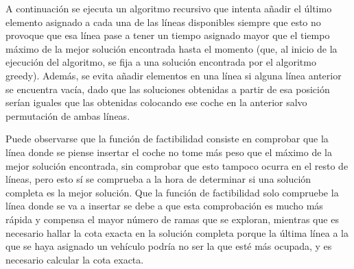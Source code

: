 A continuación se ejecuta un algoritmo recursivo que intenta añadir el último elemento asignado a cada una de las líneas disponibles siempre que esto no provoque que esa línea pase a tener un tiempo asignado mayor que el tiempo máximo de la mejor solución encontrada hasta el momento (que, al inicio de la ejecución del algoritmo, se fija a una solución encontrada por el algoritmo greedy). Además, se evita añadir elementos en una línea si alguna línea anterior se encuentra vacía, dado que las soluciones obtenidas a partir de esa posición serían iguales que las obtenidas colocando ese coche en la anterior salvo permutación de ambas líneas.


Puede observarse que la función de factibilidad consiste en comprobar que la línea donde se piense insertar el coche no tome más peso que el máximo de la mejor solución encontrada, sin comprobar que esto tampoco ocurra en el resto de líneas, pero esto sí se comprueba a la hora de determinar si una solución completa es la mejor solución. Que la función de factibilidad solo compruebe la línea donde se va a insertar se debe a que esta comprobación es mucho más rápida y compensa el mayor número de ramas que se exploran, mientras que es necesario hallar la cota exacta en la solución completa porque la última línea a la que se haya asignado un vehículo podría no ser la que esté más ocupada, y es necesario calcular la cota exacta.


